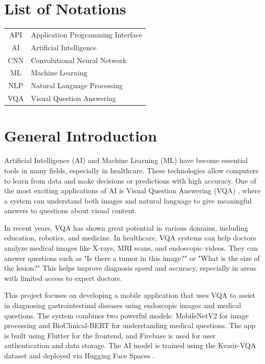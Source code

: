 \documentclass[12pt,a4paper]{report}
\begin{document}
\chapter*{List of Notations}
\begin{tabular}{cl}
API & Application Programming Interface\\ 
AI  & Artificial Intelligence \\
CNN & Convolutional Neural Network\\
ML  & Machine Learning \\
NLP & Natural Language Processing\\  
VQA & Visual Question Answering\\
\end{tabular}

\newpage  %


\listoffigures

\chapter*{General Introduction}
Artificial Intelligence (AI) and Machine Learning (ML) have become essential tools in many fields, especially in healthcare. These technologies allow computers to learn from data and make decisions or predictions with high accuracy. One of the most exciting applications of AI is Visual Question Answering (VQA) , where a system can understand both images and natural language to give meaningful answers to questions about visual content.

In recent years, VQA has shown great potential in various domains, including education, robotics, and medicine. In healthcare, VQA systems can help doctors analyze medical images like X-rays, MRI scans, and endoscopic videos. They can answer questions such as "Is there a tumor in this image?" or "What is the size of the lesion?" This helps improve diagnosis speed and accuracy, especially in areas with limited access to expert doctors.

This project focuses on developing a mobile application that uses VQA to assist in diagnosing gastrointestinal diseases using endoscopic images and medical questions. The system combines two powerful models: MobileNetV2 for image processing and BioClinical-BERT for understanding medical questions. The app is built using Flutter for the frontend, and Firebase is used for user authentication and data storage. The AI model is trained using the Kvasir-VQA dataset and deployed via Hugging Face Spaces .
\end{document}
